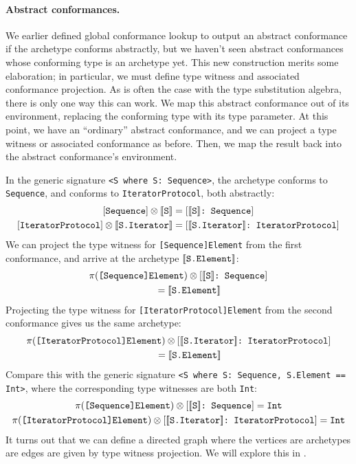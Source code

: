 \documentclass[../generics]{subfiles}
\begin{document}
\paragraph{Abstract conformances.}
We earlier defined global conformance lookup to output an abstract conformance if the archetype conforms abstractly, but we haven't seen abstract conformances whose conforming type is an archetype yet. This new construction merits some elaboration; in particular, we must define type witness and associated conformance projection. As is often the case with the type substitution algebra, there is only one way this can work. We map this abstract conformance out of its environment, replacing the conforming type with its type parameter. At this point, we have an ``ordinary'' abstract conformance, and we can project a type witness or associated conformance as before. Then, we map the result back into the abstract conformance's environment.

In the generic signature \verb|<S where S: Sequence>|, the archetype  conforms to \texttt{Sequence}, and  conforms to \texttt{IteratorProtocol}, both abstractly:
\begin{gather*}
\protosym{Sequence}\otimes \archetype{S} = \ConfReq{$\archetype{S}$}{Sequence}\\
\protosym{IteratorProtocol}\otimes \archetype{S.Iterator} = \ConfReq{$\archetype{S.Iterator}$}{IteratorProtocol}
\end{gather*}
We can project the type witness for \texttt{[Sequence]Element} from the first conformance, and arrive at the archetype $[\![\texttt{S.Element}]\!]$:
\begin{gather*}
\pi(\texttt{[Sequence]Element}) \otimes [\texttt{$[\![\texttt{S}]\!]$:~Sequence}]\\
\qquad {} = [\![\texttt{S.Element}]\!]
\end{gather*}
Projecting the type witness for \texttt{[IteratorProtocol]Element} from the second conformance gives us the same archetype:
\begin{gather*}
\pi(\texttt{[IteratorProtocol]Element})\otimes [\texttt{$[\![\texttt{S.Iterator}]\!]$:~IteratorProtocol}]\\
\qquad {} = [\![\texttt{S.Element}]\!] 
\end{gather*}
Compare this with the generic signature \verb|<S where S: Sequence, S.Element == Int>|, where the corresponding type witnesses are both \texttt{Int}:
\begin{gather*}
\pi(\texttt{[Sequence]Element}) \otimes [\texttt{$[\![\texttt{S}]\!]$:~Sequence}] = \texttt{Int} \\
\pi(\texttt{[IteratorProtocol]Element})\otimes [\texttt{$[\![\texttt{S.Iterator}]\!]$:~IteratorProtocol}] = \texttt{Int}
\end{gather*}
It turns out that we can define a directed graph where the vertices are archetypes are edges are given by type witness projection. We will explore this in .
\end{document}
